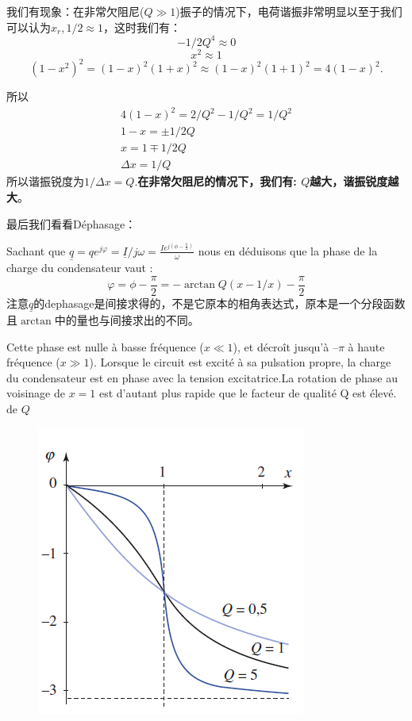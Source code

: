 \documentclass[12pt]{book}
\theoremstyle{definition}\newtheorem{dfn}{Définition}[chapter]
\theoremstyle{plain}\newtheorem{thm}{Théorème}[chapter]
\theoremstyle{plain}\newtheorem{prp}{Proposition}[chapter]
\theoremstyle{plain}\newtheorem{lem}{\bf Lemme}[chapter]
\theoremstyle{plain}\newtheorem{axm}{\bf Axiome}[chapter]
\theoremstyle{plain}\newtheorem{lmm}{\bf Lemme}[chapter]
\theoremstyle{plain}\newtheorem{cor}{\bf Corollaire}[chapter]
\theoremstyle{remark}\newtheorem{rem}{Remarque}[chapter]
\begin{document}
我们有现象：在非常欠阻尼($Q\gg 1$)振子的情况下，电荷谐振非常明显以至于我们可以认为$x_r,1/2\approx 1$，这时我们有：
$$-1/2Q^4\approx0$$
$$x^2\approx1$$
$$
(1-x^2)^2=(1-x)^2(1+x)^2\approx(1-x)^2(1+1)^2=4(1-x)^2
.$$

所以
$$
\begin{aligned}
4(1-x)^2=2/Q^2-1/Q^2=1/Q^2\\
1-x=\pm1/2Q\\
x=1\mp1/2Q\\
\Delta x=1/Q
\end{aligned}
$$
所以谐振锐度为$1/\Delta x=Q$.\textbf{在非常欠阻尼的情况下，我们有: $Q$越大，谐振锐度越大}。

最后我们看看Déphasage：

Sachant que $\underline{q}=qe^{j\varphi}=\underline{I}/j\omega=\frac{Ie^{j(\phi-\frac{\pi}{2})}}{\omega}$
nous en déduisons que la
phase de la charge du condensateur vaut :
$$
\varphi=\phi-\frac{\pi}{2}=-\arctan{Q(x-1/x)}-\frac{\pi}{2}
$$
注意$\underline{q}$的dephasage是间接求得的，不是它原本的相角表达式，原本是一个分段函数且$\arctan$中的量也与间接求出的不同。

Cette phase est nulle à basse fréquence ($x\ll1$), et décroît jusqu’à $–\pi$ à haute
fréquence ($x\gg1$). Lorsque le circuit est excité à sa pulsation propre, la charge du condensateur est en phase avec la tension excitatrice.La rotation de phase au voisinage de $x=1$ est d’autant plus rapide que le facteur de qualité Q est élevé.
de $Q$

\begin{figure}[H]
	\centering
	\includegraphics[scale=0.8]{Etude du circuit RLC serie-Resonances//9}
\end{figure}
\end{document}
